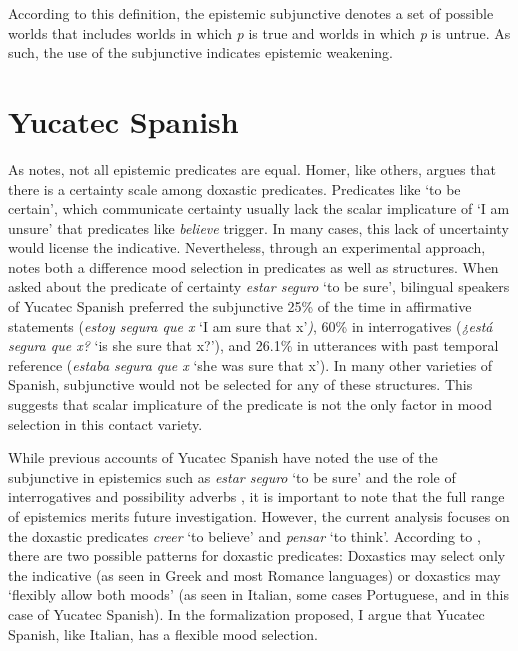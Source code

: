 \documentclass[output=paper,colorlinks,citecolor=brown,
]{langscibook}
\begin{document}
According to this definition, the epistemic subjunctive denotes a set of possible worlds that includes worlds in which \textit{p} is true and worlds in which \textit{p} is untrue. As such, the use of the subjunctive indicates epistemic weakening.


\section{
Yucatec Spanish}

As \citet{Homer2007} notes, not all epistemic predicates are equal. Homer, like others, argues that there is a certainty scale among doxastic predicates. Predicates like `to be certain', which communicate certainty usually lack the scalar implicature of `I am unsure' that predicates like \textit{believe} trigger. In many cases, this lack of uncertainty would license the indicative. Nevertheless, through an experimental approach, \citet{bove2020a} notes both a difference mood selection in predicates as well as structures. When asked about the predicate of certainty \textit{estar seguro }`to be sure', bilingual speakers of Yucatec Spanish preferred the subjunctive 25\% of the time in affirmative statements (\textit{estoy segura que x }`I am sure that x'\textit{)}, 60\% in interrogatives (\textit{¿está segura que x?} `is she sure that x?'), and 26.1\% in utterances with past temporal reference (\textit{estaba segura que x }`she was sure that x'). In many other varieties of Spanish, subjunctive would not be selected for any of these structures. This suggests that scalar implicature of the predicate is not the only factor in mood selection in this contact variety.



While previous accounts of Yucatec Spanish have noted the use of the subjunctive in epistemics such as \textit{estar seguro }`to be sure' \citep{bove2020a} and the role of interrogatives and possibility adverbs \citep{Bove2020}, it is important to note that the full range of epistemics merits future investigation. However, the current analysis focuses on the doxastic predicates \textit{creer }`to believe' and \textit{pensar }`to think'. According to \citet[133]{GiannakidouMari2020}, there are two possible patterns for doxastic predicates: Doxastics may select only the indicative (as seen in Greek and most Romance languages) or doxastics may `flexibly allow both moods' (as seen in Italian, some cases Portuguese, and in this case of Yucatec Spanish). In the formalization proposed, I argue that Yucatec Spanish, like Italian, has a flexible mood selection.
\end{document}
